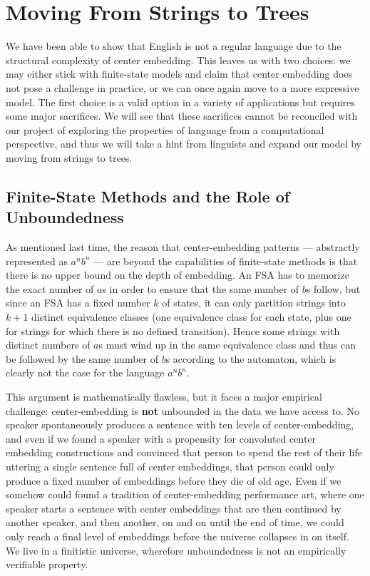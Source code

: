 \chapter{Moving From Strings to Trees}
\label{cha:Trees}

We have been able to show that English is not a regular language due to the structural complexity of center embedding.
This leaves us with two choices: we may either stick with finite-state models and claim that center embedding does not pose a challenge in practice, or we can once again move to a more expressive model.
The first choice is a valid option in a variety of applications but requires some major sacrifices.
We will see that these sacrifices cannot be reconciled with our project of exploring the properties of language from a computational perspective, and thus we will take a hint from linguists and expand our model by moving from strings to trees.

\section{Finite-State Methods and the Role of Unboundedness}

As mentioned last time, the reason that center-embedding patterns --- abstractly represented as $a^n b^n$ --- are beyond the capabilities of finite-state methods is that there is no upper bound on the depth of embedding.
An FSA has to memorize the exact number of $a$s in order to ensure that the same number of $b$s follow, but since an FSA has a fixed number $k$ of states, it can only partition strings into $k+1$ distinct equivalence classes (one equivalence class for each state, plus one for strings for which there is no defined transition).
Hence some strings with distinct numbers of $a$s must wind up in the same equivalence class and thus can be followed by the same number of $b$s according to the automaton, which is clearly not the case for the language $a^n b^n$.

This argument is mathematically flawless, but it faces a major empirical challenge: center-embedding is \textbf{not} unbounded in the data we have access to.
No speaker spontaneously produces a sentence with ten levels of center-embedding, and even if we found a speaker with a propensity for convoluted center embedding constructions and convinced that person to spend the rest of their life uttering a single sentence full of center embeddings, that person could only produce a fixed number of embeddings before they die of old age.
Even if we somehow could found a tradition of center-embedding performance art, where one speaker starts a sentence with center embeddings that are then continued by another speaker, and then another, on and on until the end of time, we could only reach a final level of embeddings before the universe collapses in on itself.
We live in a finitistic universe, wherefore unboundedness is not an empirically verifiable property.

